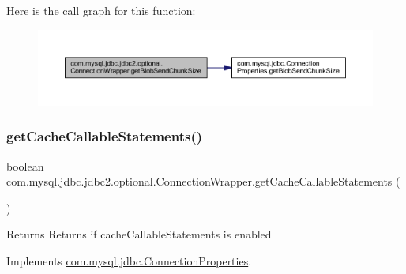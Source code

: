 Here is the call graph for this function\+:
\nopagebreak
\begin{figure}[H]
\begin{center}
\leavevmode
\includegraphics[width=350pt]{classcom_1_1mysql_1_1jdbc_1_1jdbc2_1_1optional_1_1_connection_wrapper_a467921d50234ef25af6c18ebfa842db6_cgraph}
\end{center}
\end{figure}
\mbox{\label{classcom_1_1mysql_1_1jdbc_1_1jdbc2_1_1optional_1_1_connection_wrapper_abc5b471648eac8eb49a7c16d561de680}} 
\subsubsection{\texorpdfstring{get\+Cache\+Callable\+Statements()}{getCacheCallableStatements()}}
{\footnotesize\ttfamily boolean com.\+mysql.\+jdbc.\+jdbc2.\+optional.\+Connection\+Wrapper.\+get\+Cache\+Callable\+Statements (\begin{DoxyParamCaption}{ }\end{DoxyParamCaption})}

\begin{DoxyReturn}{Returns}
Returns if cache\+Callable\+Statements is enabled 
\end{DoxyReturn}


Implements \mbox{\hyperlink{interfacecom_1_1mysql_1_1jdbc_1_1_connection_properties_a24408439f0eeff0fd5181509fa6b68d0}{com.\+mysql.\+jdbc.\+Connection\+Properties}}.


